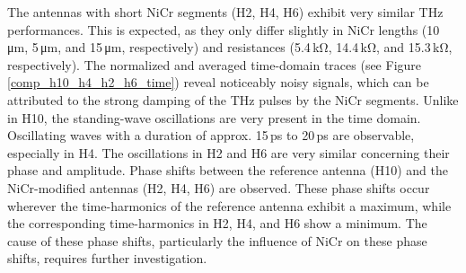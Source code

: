 The antennas with short NiCr segments (H2, H4, H6) exhibit very similar THz performances. This is expected, as they only differ slightly in NiCr lengths (\num{10}\,\si{\micro\meter}, \num{5}\,\si{\micro\meter}, and \num{15}\,\si{\micro\meter}, respectively) and resistances (\num{5.4}\,\si{\kilo\ohm}, \num{14.4}\,\si{\kilo\ohm}, and \num{15.3}\,\si{\kilo\ohm}, respectively). The normalized and averaged time-domain traces (see Figure \ref{comp_h10_h4_h2_h6_time}) reveal noticeably noisy signals, which can be attributed to the strong damping of the THz pulses by the NiCr segments. Unlike in H10, the standing-wave oscillations are very present in the time domain. Oscillating waves with a duration of approx. \num{15}\,\si{\pico \s} to \num{20}\,\si{\pico \s} are observable, especially in H4. The oscillations in H2 and H6 are very similar concerning their phase and amplitude. Phase shifts between the reference antenna (H10) and the NiCr-modified antennas (H2, H4, H6) are observed. These phase shifts occur wherever the time-harmonics of the reference antenna exhibit a maximum, while the corresponding time-harmonics in H2, H4, and H6 show a minimum. The cause of these phase shifts, particularly the influence of NiCr on these phase shifts, requires further investigation.
